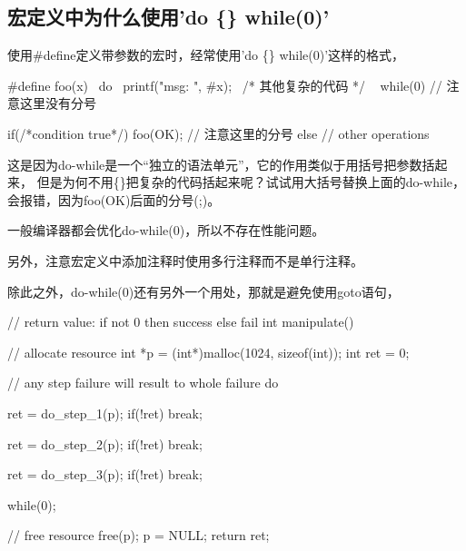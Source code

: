 \subsection[Why use 'do \{\} while(0)']{宏定义中为什么使用'do \{\} while(0)'}
使用\#define定义带参数的宏时，经常使用'do \{\} while(0)'这样的格式，

\begin{cppcode}
#define foo(x) \
  do { \
    printf("msg: ", #x); \
    /* 其他复杂的代码 */ \
  } while(0) // 注意这里没有分号

if(/*condition true*/)
  foo(OK); // 注意这里的分号
else
  // other operations
\end{cppcode}

这是因为do-while是一个“独立的语法单元”，它的作用类似于用括号把参数括起来，
但是为何不用\{\}把复杂的代码括起来呢？试试用大括号替换上面的do-while，
会报错，因为foo(OK)后面的分号(;)。

一般编译器都会优化do-while(0)，所以不存在性能问题。

另外，注意宏定义中添加注释时使用多行注释而不是单行注释。

\vspace{0.5cm}

除此之外，do-while(0)还有另外一个用处，那就是避免使用goto语句，

\begin{cppcode}
// return value: if not 0 then success else fail
int manipulate() {
  // allocate resource
  int *p = (int*)malloc(1024, sizeof(int));
  int ret = 0;
  
  // any step failure will result to whole failure
  do {
    ret = do_step_1(p);
    if(!ret) break;
    
    ret = do_step_2(p);
    if(!ret) break;
    
    ret = do_step_3(p);
    if(!ret) break;
  } while(0);
  
  // free resource
  free(p);
  p = NULL;
  return ret;
}
\end{cppcode}
